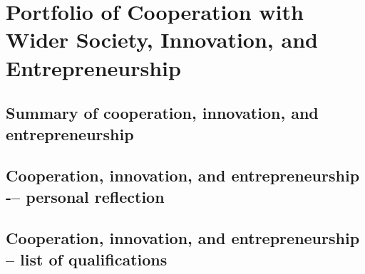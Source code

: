 \chapter{Portfolio of Cooperation with Wider Society, Innovation, and Entrepreneurship}

\section{Summary of cooperation, innovation, and entrepreneurship} \label{sec:summary-of-cooperation-innovation-and-entrepreneurship}

\section{Cooperation, innovation, and entrepreneurship -– personal reflection} \label{sec:cooperation-innovation-and-entrepreneurship-personal-reflection}

\section{Cooperation, innovation, and entrepreneurship – list of qualifications} \label{sec:cooperation-innovation-and-entrepreneurship-list-of-qualifications}
